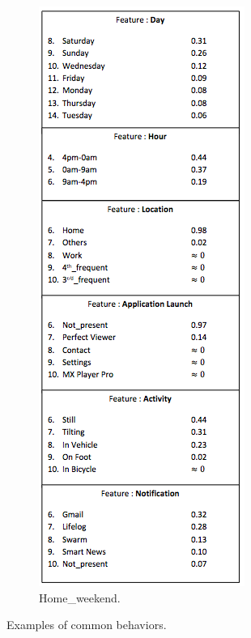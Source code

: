 \begin{figure}[t!]
\begin{subfigure}[t]{0.33\textwidth}
        \includegraphics[scale=0.515]{Figures/Homeweekend.png}
        \caption{Home\_weekend.}
    \end{subfigure}

    \caption{Examples of common behaviors.}
\label{commonBehavior}
\end{figure}


